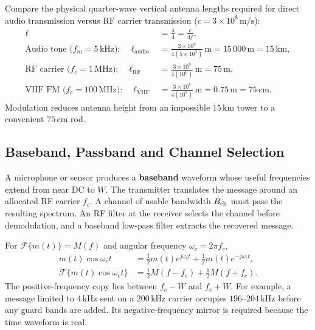 \documentclass[12pt,a4paper]{article}
\begin{document}
\begin{tcolorbox}[examplebox, title={Quarter-Wave Antenna Dimension Calculation}]
Compare the physical quarter-wave vertical antenna lengths required for direct audio transmission versus RF carrier transmission ($c=3\times10^8\,\mathrm{m/s}$):
\[
\begin{aligned}
 \ell&=\frac{\lambda}{4}=\frac{c}{4f},\\
 \text{Audio tone ($f_m = 5\,\mathrm{kHz}$):}\quad \ell_{\mathrm{audio}}&=\frac{3\times10^8}{4(5\times10^3)}\,\mathrm{m} = 15\,000\,\mathrm{m} = 15\,\mathrm{km},\\
 \text{RF carrier ($f_c = 1\,\mathrm{MHz}$):}\quad \ell_{\mathrm{RF}}&=\frac{3\times10^8}{4(10^6)}\,\mathrm{m} = 75\,\mathrm{m},\\
 \text{VHF FM ($f_c = 100\,\mathrm{MHz}$):}\quad \ell_{\mathrm{VHF}}&=\frac{3\times10^8}{4(10^8)}\,\mathrm{m} = 0.75\,\mathrm{m} = 75\,\mathrm{cm}.
\end{aligned}
\]
Modulation reduces antenna height from an impossible $15\,\mathrm{km}$ tower to a convenient $75\,\mathrm{cm}$ rod.
\end{tcolorbox}

\subsection{Baseband, Passband and Channel Selection}
A microphone or sensor produces a \textbf{baseband} waveform whose useful frequencies extend from near DC to $W$. The transmitter translates the message around an allocated RF carrier $f_c$. A channel of usable bandwidth $B_{\rm ch}$ must pass the resulting spectrum. An RF filter at the receiver selects the channel before demodulation, and a baseband low-pass filter extracts the recovered message.

\begin{tcolorbox}[formulabox, title={Why Carrier Multiplication Shifts the Spectrum}]
For $\mathcal F\{m(t)\}=M(f)$ and angular frequency $\omega_c=2\pi f_c$,
\[
\begin{aligned}
 m(t)\cos\omega_ct
   &=\tfrac12m(t)e^{j\omega_ct}+\tfrac12m(t)e^{-j\omega_ct},\\
 \mathcal F\{m(t)\cos\omega_ct\}
   &=\tfrac12M(f-f_c)+\tfrac12M(f+f_c).
\end{aligned}
\]
The positive-frequency copy lies between $f_c-W$ and $f_c+W$. For example, a message limited to $4\,\mathrm{kHz}$ sent on a $200\,\mathrm{kHz}$ carrier occupies $196$--$204\,\mathrm{kHz}$ before any guard bands are added. Its negative-frequency mirror is required because the time waveform is real.
\end{tcolorbox}
\end{document}
